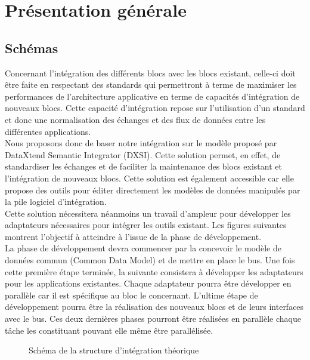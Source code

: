 \section{Présentation générale}

\subsection{Schémas}

Concernant l’intégration des différents blocs avec les blocs existant, celle-ci doit être faite en respectant des standards qui permettront à terme de maximiser les performances de l’architecture applicative en terme de capacités d’intégration de nouveaux blocs. Cette capacité d’intégration repose sur l’utilisation d’un standard et donc une normalisation des échanges et des flux de données entre les différentes applications. \\

Nous proposons donc de baser notre intégration sur le modèle proposé par DataXtend Semantic Integrator (DXSI). Cette solution permet, en effet, de standardiser les échanges et de faciliter la maintenance des blocs existant et l’intégration de nouveaux blocs. Cette solution est également accessible car elle propose des outils pour éditer directement les modèles de données manipulés par la pile logiciel d’intégration. \\

Cette solution nécessitera néanmoins un travail d’ampleur pour développer les adaptateurs nécessaires pour intégrer les outils existant. Les figures suivantes montrent l’objectif à atteindre à l’issue de la phase de développement. \\
    
La phase de  développement devra commencer par la concevoir le modèle de données commun (Common Data Model) et de mettre en place le bus. Une fois cette première étape terminée, la suivante consistera à développer les adaptateurs pour les applications existantes. Chaque adaptateur pourra être développer en parallèle car il est spécifique au bloc le concernant. L’ultime étape de développement pourra être la réalisation des nouveaux blocs et de leurs interfaces avec le bus. Ces deux dernières phases pourront être réalisées en parallèle chaque tâche les constituant pouvant elle même être parallélisée. \\

\begin{figure}[H]
    \label{fig-bus}
    \noindent{}
    \caption{Schéma de la structure d'intégration théorique}
\end{figure}

